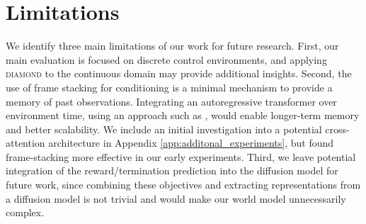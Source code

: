 \vspace{-2mm}
\section{Limitations}
\label{sec:limitations}

We identify three main limitations of our work for future research. First, our main evaluation is focused on discrete control environments, and applying \textsc{diamond} to the continuous domain may provide additional insights. Second, the use of frame stacking for conditioning is a minimal mechanism to provide a memory of past observations. Integrating an autoregressive transformer over environment time, using an approach such as \citet{dit2023}, would enable longer-term memory and better scalability. We include an initial investigation into a potential cross-attention architecture in Appendix \ref{app:additonal_experiments}, but found frame-stacking more effective in our early experiments. Third, we leave potential integration of the reward/termination prediction into the diffusion model for future work, since combining these objectives and extracting representations from a diffusion model is not trivial \citep{luo2023dhf, xu2023open} and would make our world model unnecessarily complex.
